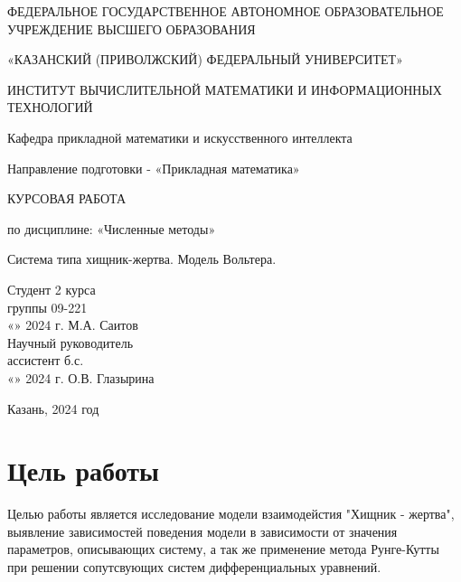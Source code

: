 \documentclass[a4paper,12pt]{article}
\begin{document}
\renewcommand\contentsname{Содержание}
\renewcommand{\arraystretch}{1.3} 
\thispagestyle{empty}
\begin{center}
    ФЕДЕРАЛЬНОЕ ГОСУДАРСТВЕННОЕ АВТОНОМНОЕ ОБРАЗОВАТЕЛЬНОЕ
    УЧРЕЖДЕНИЕ ВЫСШЕГО ОБРАЗОВАНИЯ
    \vspace{0.1cm}

    «КАЗАНСКИЙ (ПРИВОЛЖСКИЙ)  ФЕДЕРАЛЬНЫЙ УНИВЕРСИТЕТ»
    \vspace{0.1cm}

    ИНСТИТУТ ВЫЧИСЛИТЕЛЬНОЙ МАТЕМАТИКИ И ИНФОРМАЦИОННЫХ ТЕХНОЛОГИЙ

    Кафедра прикладной математики и искусственного интеллекта

    Направление подготовки - «Прикладная математика»
\end{center}
\vspace{2cm}

\begin{center}
    КУРСОВАЯ РАБОТА
    \vspace{0.2cm}
 
    по дисциплине: «Численные методы»
    \vspace{0.2cm}
 
    Система типа хищник-жертва. Модель Вольтера.
\end{center}

\vspace{3cm}
\noindent Студент 2 курса\\
группы 09-221\\
«\underline{\qquad}» \underline{\qquad\qquad} 2024 г. \qquad\qquad\quad \underline{\qquad\qquad\qquad\quad} \qquad М.А. Саитов\\
Научный руководитель\\
ассистент б.с.\\
«\underline{\qquad}» \underline{\qquad\qquad} 2024 г. \qquad\qquad\quad \underline{\qquad\qquad\qquad\quad} \qquad О.В. Глазырина

\vfill
\begin{center} \large{Казань, 2024 год} \end{center}
\thispagestyle{empty}
 

\newpage
\begin{center}
\renewcommand{\contentsname}{Содержание}
\fontsize{14}{1.15}\selectfont
\mdseries\selectfont{\tableofcontents}
\newpage
\end{center}
\setlength{\parindent}{1.25cm}
\newpage

\section{Цель работы}
\hspace{0.5cm} Целью работы является исследование модели взаимодейстия "Хищник - жертва",
выявление зависимостей поведения модели в зависимости от значения параметров,
описывающих систему, а так же применение метода Рунге-Кутты при решении сопутсвующих систем дифференциальных 
уравнений.
\end{document}
